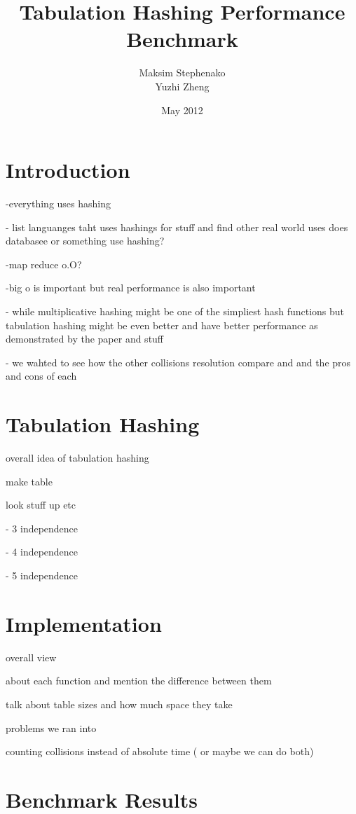 \documentclass[12pt]{article}
\title{Tabulation Hashing Performance Benchmark}
\author{Maksim Stephenako \\ Yuzhi Zheng}
\date{May 2012}
\begin{document}
\setlength{\baselineskip}{1.25\baselineskip}

\ifpdf
{}
\else
{}
\fi

\maketitle

\section{Introduction}
-everything uses hashing

- list languanges taht uses hashings for stuff
	and find other real world uses does databasee or something use hashing?
	
	-map reduce o.O?

-big o is important  but real performance is also important

- while multiplicative hashing might be one of the simpliest hash functions but tabulation hashing might be even better and have better performance as demonstrated by the paper and stuff

- we wahted to see how the other collisions resolution compare and  and the pros and cons of each


\section{Tabulation Hashing}
overall idea of tabulation hashing

make table

look stuff up etc
 
- 3 independence
 
- 4 independence

- 5 independence
\section{Implementation}
overall view

about each function and mention the difference between them

talk about table sizes and how much space they take

problems we ran into

counting collisions instead of absolute time ( or maybe we can do both)


\section{Benchmark Results}
\end{document}
